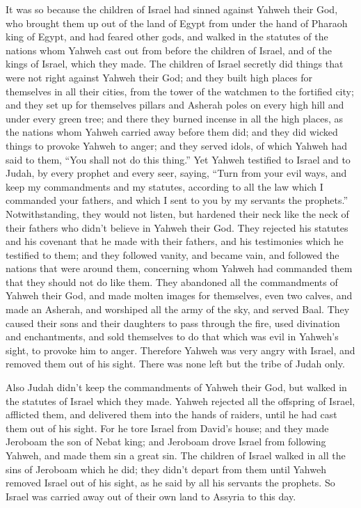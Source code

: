  It was so because the children of Israel had sinned
against Yahweh their God, who brought them up out of the land of Egypt
from under the hand of Pharaoh king of Egypt, and had feared other gods,
 and walked in the statutes of the nations whom Yahweh
cast out from before the children of Israel, and of the kings of Israel,
which they made.  The children of Israel secretly did
things that were not right against Yahweh their God; and they built high
places for themselves in all their cities, from the tower of the
watchmen to the fortified city;  and they set up for
themselves pillars and Asherah poles on every high hill and under every
green tree;  and there they burned incense in all the
high places, as the nations whom Yahweh carried away before them did;
and they did wicked things to provoke Yahweh to anger; 
and they served idols, of which Yahweh had said to them, ``You shall not
do this thing.''  Yet Yahweh testified to Israel and to
Judah, by every prophet and every seer, saying, ``Turn from your evil
ways, and keep my commandments and my statutes, according to all the law
which I commanded your fathers, and which I sent to you by my servants
the prophets.''  Notwithstanding, they would not listen,
but hardened their neck like the neck of their fathers who didn't
believe in Yahweh their God.  They rejected his statutes
and his covenant that he made with their fathers, and his testimonies
which he testified to them; and they followed vanity, and became vain,
and followed the nations that were around them, concerning whom Yahweh
had commanded them that they should not do like them. 
They abandoned all the commandments of Yahweh their God, and made molten
images for themselves, even two calves, and made an Asherah, and
worshiped all the army of the sky, and served Baal.  They
caused their sons and their daughters to pass through the fire, used
divination and enchantments, and sold themselves to do that which was
evil in Yahweh's sight, to provoke him to anger. 
Therefore Yahweh was very angry with Israel, and removed them out of his
sight. There was none left but the tribe of Judah only.

 Also Judah didn't keep the commandments of Yahweh their
God, but walked in the statutes of Israel which they made.
 Yahweh rejected all the offspring of Israel, afflicted
them, and delivered them into the hands of raiders, until he had cast
them out of his sight.  For he tore Israel from David's
house; and they made Jeroboam the son of Nebat king; and Jeroboam drove
Israel from following Yahweh, and made them sin a great sin.
 The children of Israel walked in all the sins of
Jeroboam which he did; they didn't depart from them 
until Yahweh removed Israel out of his sight, as he said by all his
servants the prophets. So Israel was carried away out of their own land
to Assyria to this day.

